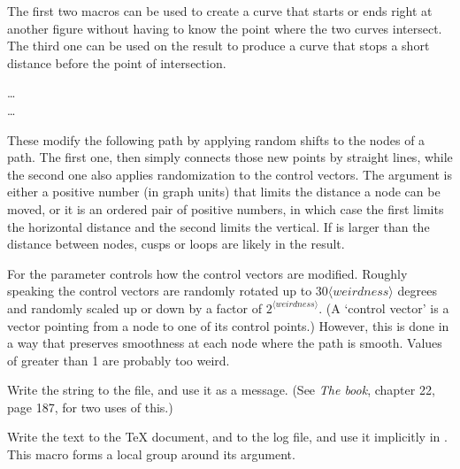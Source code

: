 \documentclass[letterpaper]{article}
\begin{document}
The first two macros can be used to create a curve that starts or ends
right at another figure without having to know the point where the two
curves intersect. The third one can be used on the result to produce a
curve that stops a short distance before the point of intersection.

\begin{cd}
\dots\\
\dots
{}%
\end{cd}

These modify the following path by applying random shifts to the nodes
of a path. The first one,  then simply connects those
new points by straight lines, while the second one also applies
randomization to the control vectors. The  argument is
either a positive number (in graph units) that limits the distance a
node can be moved, or it is an ordered pair of positive numbers, in
which case the first limits the horizontal distance and the second
limits the vertical. If  is larger than the distance
between nodes, cusps or loops are likely in the result.

For  the  parameter controls how the
control vectors are modified. Roughly speaking the control vectors are
randomly rotated up to $30\langle\mathit{weirdness}\rangle$ degrees and
randomly scaled up or down by a factor of
$2^{\langle\mathit{weirdness}\rangle}$. (A `control vector' is a vector
pointing from a node to one of its control points.) However, this is
done in a way that preserves smoothness at each node where the path is
smooth. Values of  greater than 1 are probably too
weird.


\begin{cd}
%
\end{cd}

Write the string  to the \MF{} file, and use it as a \MF{}
message. (See \textit{The \MF{}book}, chapter 22, page 187, for two uses of
this.)

\begin{cd}
%
\end{cd}

Write the text  to the \TeX{} document, and to the log file,
and use it implicitly in . This macro forms a local group
around its argument.
\end{document}
